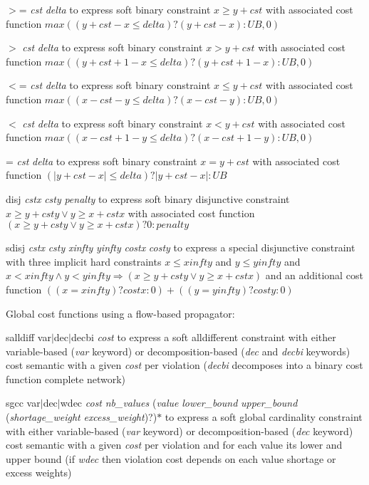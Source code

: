 \documentclass{article}
\begin{document}
\begin{DoxyItemize}
\item $>$= {\itshape cst} {\itshape delta} to express soft binary constraint $x \geq y + cst$ with associated cost function $max( (y + cst - x \leq delta)?(y + cst - x):UB , 0 )$
\item $>$ {\itshape cst} {\itshape delta} to express soft binary constraint $x > y + cst$ with associated cost function $max( (y + cst + 1 - x \leq delta)?(y + cst + 1 - x):UB , 0 )$
\item $<$= {\itshape cst} {\itshape delta} to express soft binary constraint $x \leq y + cst$ with associated cost function $max( (x - cst - y \leq delta)?(x - cst - y):UB , 0 )$
\item $<$ {\itshape cst} {\itshape delta} to express soft binary constraint $x < y + cst$ with associated cost function $max( (x - cst + 1 - y \leq delta)?(x - cst + 1 - y):UB , 0 )$
\item = {\itshape cst} {\itshape delta} to express soft binary constraint $x = y + cst$ with associated cost function $(|y + cst - x| \leq delta)?|y + cst - x|:UB$
\item disj {\itshape cstx} {\itshape csty} {\itshape penalty} to express soft binary disjunctive constraint $x \geq y + csty \vee y \geq x + cstx$ with associated cost function $(x \geq y + csty \vee y \geq x + cstx)?0:penalty$
\item sdisj {\itshape cstx} {\itshape csty} {\itshape xinfty} {\itshape yinfty} {\itshape costx} {\itshape costy} to express a special disjunctive constraint with three implicit hard constraints $x \leq xinfty$ and $y \leq yinfty$ and $x < xinfty \wedge y < yinfty \Rightarrow (x \geq y + csty \vee y \geq x + cstx)$ and an additional cost function $((x = xinfty)?costx:0) + ((y= yinfty)?costy:0)$
\item Global cost functions using a flow-\/based propagator\-:
\begin{DoxyItemize}
\item salldiff var$\vert$dec$\vert$decbi {\itshape cost} to express a soft alldifferent constraint with either variable-\/based ({\itshape var} keyword) or decomposition-\/based ({\itshape dec} and {\itshape decbi} keywords) cost semantic with a given {\itshape cost} per violation ({\itshape decbi} decomposes into a binary cost function complete network)
\item sgcc var$\vert$dec$\vert$wdec {\itshape cost} {\itshape nb\-\_\-values} ({\itshape value} {\itshape lower\-\_\-bound} {\itshape upper\-\_\-bound} ({\itshape shortage\-\_\-weight} {\itshape excess\-\_\-weight})?)$\ast$ to express a soft global cardinality constraint with either variable-\/based ({\itshape var} keyword) or decomposition-\/based ({\itshape dec} keyword) cost semantic with a given {\itshape cost} per violation and for each value its lower and upper bound (if {\itshape wdec} then violation cost depends on each value shortage or excess weights)

\end{DoxyItemize}
\end{DoxyItemize}
\end{document}

